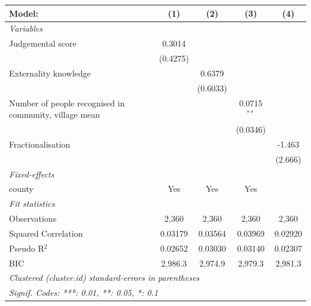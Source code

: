 \documentclass[
]{article}
\begin{document}
\begin{table}[htbp]
\begingroup
\centering
\begin{tabular}{lcccc}
   \tabularnewline \midrule \midrule
   Model:                                                 & (1)      & (2)      & (3)           & (4)\\  
   \midrule
   \emph{Variables}\\
   Judgemental score                                      & 0.3014   &          &               &   \\   
                                                          & (0.4275) &          &               &   \\   
   Externality knowledge                                  &          & 0.6379   &               &   \\   
                                                          &          & (0.6033) &               &   \\   
   Number of people recognised in community, village mean &          &          & 0.0715$^{**}$ &   \\   
                                                          &          &          & (0.0346)      &   \\   
   Fractionalisation                                      &          &          &               & -1.463\\   
                                                          &          &          &               & (2.666)\\   
   \midrule
   \emph{Fixed-effects}\\
   county                                                 & Yes      & Yes      & Yes           & \\  
   \midrule
   \emph{Fit statistics}\\
   Observations                                           & 2,360    & 2,360    & 2,360         & 2,360\\  
   Squared Correlation                                    & 0.03179  & 0.03564  & 0.03969       & 0.02920\\  
   Pseudo R$^2$                                           & 0.02652  & 0.03030  & 0.03140       & 0.02307\\  
   BIC                                                    & 2,986.3  & 2,974.9  & 2,979.3       & 2,981.3\\  
   \midrule \midrule
   \multicolumn{5}{l}{\emph{Clustered (cluster.id) standard-errors in parentheses}}\\
   \multicolumn{5}{l}{\emph{Signif. Codes: ***: 0.01, **: 0.05, *: 0.1}}\\
\end{tabular}
\par\endgroup


\end{table}
\end{document}
